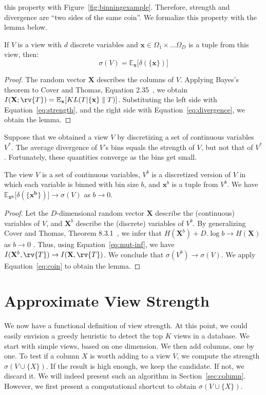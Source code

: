 this property with Figure~\ref{fig:binningexample}.  Therefore, strength and
divergence are ``two sides of the same coin''. We formalize this property with
the lemma below.
\begin{lemma}
    If $V$ is a view with $d$ discrete variables and $\mathbf{x} \in \Omega_1
    \times \ldots \Omega_D$ is a tuple from this view, then:
    \begin{equation}\label{eq:coin}
        \sigma(V) = \mathbb{E}_{\mathbf{x}}  \big[ \delta(\{\mathbf{x}\}) \big]
    \end{equation}
\end{lemma}
\begin{proof}
    The random vector $\mathbf{X}$ describes the columns of $V$. Applying
    Bayes's theorem to Cover and Thomas, Equation
    2.35~\cite{cover2012elements}, we obtain $ I(\mathbf{X} ; \rv{T})
    =\mathbb{E}_{\mathbf{x}}[ KL( T | \{\mathbf{x}\} \parallel T )]$.
    Substituting the left side with Equation~\ref{eq:strength}, and the right
    side with Equation~\ref{eq:divergence}, we obtain the lemma.
\end{proof}
Suppose that we obtained a view $V$ by discretizing a set of continuous
variables $V^*$. The average divergence of $V$'s bins equals the strength of $V$,
but not that of $V^*$. Fortunately, these quantities converge as the bins get
small.
\begin{lemma}
    The view $V$ is a set of continuous variables, $V^b$ is a discretized
    version of $V$ in which each variable is binned with bin size $b$, and
    $\mathbf{x}^b$ is a tuple from $V^b$. We have $\mathbb{E}_{\mathbf{x^b}}
    \big[ \delta(\{\mathbf{x^b}\}) \big] \to  \sigma(V)$ as $b \to 0$.
\end{lemma}
\begin{proof}
    Let the $D$-dimensional random vector $\mathbf{X}$ describe the
    (continuous) variables of $V$, and $\mathbf{X}^b$ describe the (discrete)
    variables of $V^b$. By generalizing Cover and Thomas, Theorem
    8.3.1~\cite{cover2012elements}, we infer that $H(\mathbf{X}^b) + D.\log{b}
    \to H(\mathbf{X})$ as $b \to 0$ .  Thus, using Equation~\ref{eq:mut-inf},
    we have $I(\mathbf{X}^b, \rv{T}) \to I(\mathbf{X}, \rv{T})$. We conclude
    that $\sigma(V^b) \to \sigma(V)$. We apply Equation~\ref{eq:coin} to obtain
    the lemma.
\end{proof}


\section{Approximate View Strength}
\label{sec:approximate}
We now have a functional definition of view strength.  At this point, we could
easily envision a greedy heuristic to detect the top $K$ views in a database.
We start with simple views, based on one dimension. We then add columns, one by
one.  To test if a column $X$ is worth adding to a view $V$, we compute the
strength $\sigma(V \cup \{X\})$. If the result is high enough, we keep the
candidate. If not, we discard it. We will indeed present such an algorithm in
Section~\ref{sec:column}. However, we first present a computational shortcut to
obtain $\sigma(V \cup \{X\})$.

